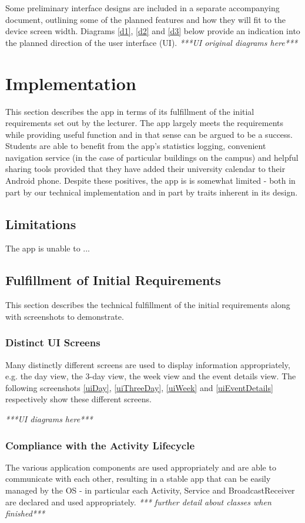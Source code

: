 \documentclass{article}
\begin{document}
Some preliminary interface designs are included in a separate accompanying document, outlining some of the planned features and how they will fit to the device screen width. Diagrams \ref{d1}, \ref{d2} and \ref{d3} below provide an indication into the planned direction of the user interface (UI).
\newline
\noindent\emph{***UI original diagrams here***}
\newline
\section{Implementation}
This section describes the app in terms of its fulfillment of the initial requirements set out by the lecturer. The app largely meets the requirements while providing useful function and in that sense can be argued to be a success. Students are able to benefit from the app's statistics logging, convenient navigation service (in the case of particular buildings on the campus) and helpful sharing tools provided that they have added their university calendar to their Android phone. Despite these positives, the app is is somewhat limited - both in part by our technical implementation and in part by traits inherent in its design. 

\subsection{Limitations}
The app is unable to ...

\subsection{Fulfillment of Initial Requirements}
This section describes the technical fulfillment of the initial requirements along with screenshots to demonstrate.

\subsubsection{Distinct UI Screens}
Many distinctly different screens are used to display information appropriately, e.g. the day view, the 3-day view, the week view and the event details view. The following screenshots \ref{uiDay}, \ref{uiThreeDay}, \ref{uiWeek} and \ref{uiEventDetails} respectively show these different screens.

\emph{***UI diagrams here***}

\subsubsection{Compliance with the Activity Lifecycle}
The various application components are used appropriately and are able to communicate with each other, resulting in a stable app that can be easily managed by the OS - in particular each Activity, Service and BroadcastReceiver are declared and used appropriately. \emph{*** further detail about classes when finished*** }
\end{document}
